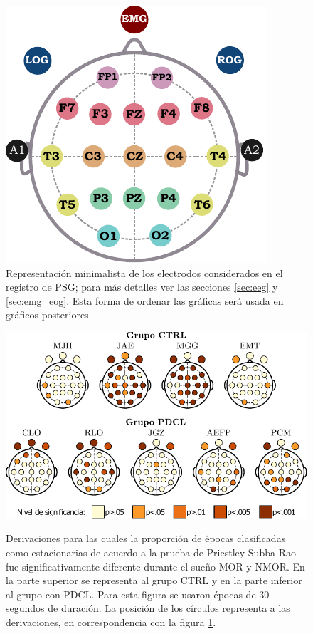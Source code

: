 \documentclass[12pt,letterpaper]{book}
\begin{document}
\begin{figure}
\centering
\includegraphics[scale=1.2]
{./img_diagramas/estampa_v1.pdf}
\caption[Representación minimalista de los electrodos para PSG]{Representación minimalista de los electrodos considerados en el registro de PSG;
para más detalles ver las secciones \ref{sec:eeg} y \ref{sec:emg_eog}.
Esta forma de ordenar las gráficas será usada en gráficos posteriores.}
\label{img:estampa}
\end{figure}

\begin{figure}
\centering
\includegraphics[width=\textwidth]{./img_art_dfa/prop_tabla.pdf} \\
\caption{Derivaciones para las cuales la proporción de épocas clasificadas como estacionarias de acuerdo a la prueba de Priestley-Subba Rao fue significativamente diferente durante el sueño MOR y NMOR.
%
En la parte superior se representa al grupo CTRL y en la parte inferior al grupo con PDCL.
%
Para esta figura se usaron épocas de 30 segundos de duración.
%
La posición de los círculos representa a las derivaciones, en correspondencia con la figura \ref{img:estampa}.}
\label{cabeza_new}
\end{figure}
\end{document}
